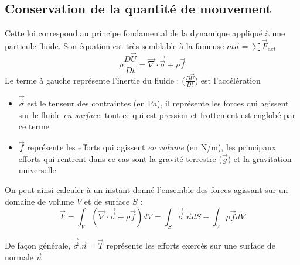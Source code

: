 \subsection{Conservation de la quantité de mouvement}
Cette loi correspond au principe fondamental de la dynamique appliqué à une particule fluide. Son équation est très semblable à la fameuse $m\vec{a}=\sum \vec{F}_{ext}$
%
\begin{equation}
\rho \frac{D\vec{U}}{Dt} = \vec{\nabla} \cdot \vec{\vec{\sigma}} + \rho \vec{f}
\label{eq:QDM}
\end{equation}
%
Le terme à gauche représente l'inertie du fluide : ($\frac{D\vec{U}}{Dt}$) est l'accélération

\begin{itemize}
\item $\vec{\vec{\sigma}}$ est le tenseur des contraintes (en Pa), il représente les forces qui agissent sur le fluide \textit{en surface}, tout ce qui est pression et frottement est englobé par ce terme

\item $\vec{f}$ représente les efforts qui agissent \textit{en volume} (en N/m), les principaux efforts qui rentrent dans ce cas sont la gravité terrestre ($\vec{g}$) et la gravitation universelle
\end{itemize}

On peut ainsi calculer à un instant donné l'ensemble des forces agissant sur un domaine de volume $V$ et de surface $S$ :
%
\begin{equation}
\vec{F} = \int_V { \left( \vec{\nabla} \cdot \vec{\vec{\sigma}} + \rho \vec{f} \right) dV }
        = \int_S { \vec{\vec{\sigma}}.\vec{n} dS} + \int_V {\rho \vec{f} dV }
\end{equation}

De façon générale, $\vec{\vec{\sigma}}.\vec{n} = \vec{T}$ représente les efforts exercés sur une surface de normale $\vec{n}$
